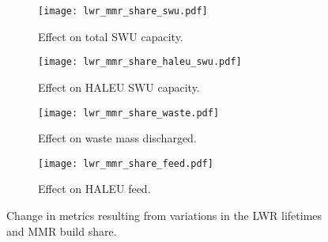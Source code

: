 \begin{figure}
    \ContinuedFloat    
    \begin{subfigure}[t]{0.48\textwidth}
        \centering
        \texttt{[image: lwr\_mmr\_share\_swu.pdf]}
        \caption{Effect on total SWU capacity.}
        \label{fig:lwr_mmr_share_swu}
    \end{subfigure}
    \hfill
    \begin{subfigure}[t]{0.48\textwidth}
        \centering
        \texttt{[image: lwr\_mmr\_share\_haleu\_swu.pdf]}
        \caption{Effect on HALEU SWU capacity.}
        \label{fig:lwr_mmr_share_haleu_swu}
    \end{subfigure}

    \begin{subfigure}[t]{0.48\textwidth}
        \centering
        \texttt{[image: lwr\_mmr\_share\_waste.pdf]}
        \caption{Effect on waste mass discharged.}
        \label{fig:lwr_mmr_share_waste}
    \end{subfigure}
    \hfill
    \begin{subfigure}[t]{0.48\textwidth}
        \centering
        \texttt{[image: lwr\_mmr\_share\_feed.pdf]}
        \caption{Effect on HALEU feed.}
        \label{fig:lwr_mmr_share_feed}
    \end{subfigure}
    \caption{Change in metrics resulting from variations in the 
    LWR lifetimes and MMR build share.}
    \label{fig:lwr_mmr_share}
\end{figure}

